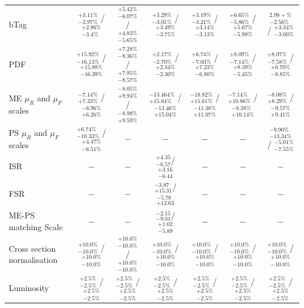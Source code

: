 \begin{table}
\begin{center}
{\begin{tabular}{lcccccc}
bTag             &  $_{-2.97\%}^{+3.11\%}$ /  $_{-3.4\%}^{+2.86\%}$   & $_{-6.07\%}^{+5.42\%}$ / $_{-5.65\%}^{+4.83\%}$  & $_{-3.01\%}^{+3.29\%}$ / $_{-3.75\%}^{+3.49\%}$  & $_{-3.21\%}^{+3.19\%}$ / $_{-3.13\%}^{+3.14\%}$  & $_{-5.86\%}^{+6.65\%}$ / $_{-5.98\%}^{+5.67\%}$ & $_{-2.56\%}^{2.98+\%}$ / $_{-3.00\%}^{+3.34\%}$\\
PDF             &  $_{-16.13\%}^{+15.92\%}$ /  $_{-16.39\%}^{+15.88\%}$   & $_{-8.36\%}^{+7.28\%}$ / $_{-8.57\%}^{+7.95\%}$  & $_{-2.70\%}^{+2.17\%}$ / $_{-2.30\%}^{+2.34\%}$  & $_{-7.03\%}^{+6.74\%}$ / $_{-6.80\%}^{+7.23\%}$  & $_{-7.14\%}^{+8.09\%}$ / $_{-5.45\%}^{+8.39\%}$ & $_{-7.58\%}^{+8.07\%}$ / $_{-8.85\%}^{+6.70\%}$\\
ME $\mu_{R}$ and $\mu_{F}$ scales             &  $_{+7.33\%}^{-7.14\%}$ /  $_{+6.26\%}^{-6.96\%}$   & $_{+9.94\%}^{-8.05\%}$ / $_{+9.59\%}^{-8.98\%}$  & $_{+15.84\%}^{-13.464\%}$ / $_{+15.04\%}^{-13.46\%}$  & $_{+11.61\%}^{-18.82\%}$ / $_{+11.07\%}^{-11.38\%}$  & $_{+10.86\%}^{-7.14\%}$ / $_{+10.14\%}^{-8.38\%}$ & $_{+8.29\%}^{-8.08\%}$ / $_{+9.41\%}^{-9.57\%}$\\
PS $\mu_{R}$ and $\mu_{F}$ scales             &  $_{-10.33\%}^{+6.74\%}$ /  $_{-6.51\%}^{+4.47\%}$  & $-$  & $-$  & $-$  & $-$ & $_{-13.34\%}^{-9.90\%}$ / $_{-7.55\%}^{-5.01\%}$  \\
ISR             &  $-$   & $-$  & $^{+4.35}_{-6.57}$/$_{-6.44}^{+3.16}$ & $-$  & $-$ & $-$  \\
FSR             &  $-$   & $-$  & $_{+15.31}^{-3.87}$/$^{-5.78}_{+12.63}$ & $-$  & $-$ & $-$  \\ 
ME-PS matching Scale             &  $-$   & $-$  & $^{-2.15}_{-9.01}$/$_{-5.89}^{+1.02}$ & $-$  & $-$ & $-$ \\
Cross section normalisation             &  $_{-10.0\%}^{+10.0\%}$ /  $_{-10.0\%}^{+10.0\%}$    & $_{-10.0\%}^{+10.0\%}$  / $_{-10.0\%}^{+10.0\%}$   & $_{-10.0\%}^{+10.0\%}$  / $_{-10.0\%}^{+10.0\%}$   & $_{-10.0\%}^{+10.0\%}$  / $_{-10.0\%}^{+10.0\%}$  & $_{-10.0\%}^{+10.0\%}$  / $_{-10.0\%}^{+10.0\%}$ & $_{-10.0\%}^{+10.0\%}$  / $_{-10.0\%}^{+10.0\%}$ \\    
Luminosity             &  $_{-2.5\%}^{+2.5\%}$ /  $_{-2.5\%}^{+2.5\%}$    & $_{-2.5\%}^{+2.5\%}$  / $_{-2.5\%}^{+2.5\%}$   & $_{-2.5\%}^{+2.5\%}$  / $_{-2.5\%}^{+2.5\%}$   & $_{-2.5\%}^{+2.5\%}$  / $_{-2.5\%}^{+2.5\%}$  & $_{-2.5\%}^{+2.5\%}$  / $_{-2.5\%}^{+2.5\%}$ & $_{-2.5\%}^{+2.5\%}$  / $_{-2.5\%}^{+2.5\%}$ \\    
\hline
\end{tabular}
}
\end{center}
\end{table}

